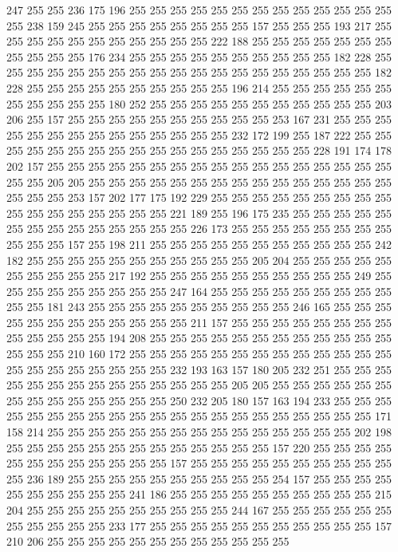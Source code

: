 247 255 255 236 175 196 255 255 255 255 255 255 255 255 255 255 255 255 255 255
238 159 245 255 255 255 255 255 255 255 255 157 255 255 255 193 217 255 255 255
255 255 255 255 255 255 255 255 222 188 255 255 255 255 255 255 255 255 255 255
255 176 234 255 255 255 255 255 255 255 255 255 255 182 228 255 255 255 255 255
255 255 255 255 255 255 255 255 255 255 255 255 255 255 182 228 255 255 255 255
255 255 255 255 255 255 196 214 255 255 255 255 255 255 255 255 255 255 255 180
252 255 255 255 255 255 255 255 255 255 255 255 203 206 255 157 255 255 255 255
255 255 255 255 255 255 253 167 231 255 255 255 255 255 255 255 255 255 255 255
255 255 255 232 172 199 255 187 222 255 255 255 255 255 255 255 255 255 255 255
255 255 255 255 255 255 228 191 174 178 202 157 255 255 255 255 255 255 255 255
255 255 255 255 255 255 255 255 255 255 255 205 205 255 255 255 255 255 255 255
255 255 255 255 255 255 255 255 255 255 255 253 157 202 177 175 192 229 255 255
255 255 255 255 255 255 255 255 255 255 255 255 255 255 255 221 189 255 196 175
235 255 255 255 255 255 255 255 255 255 255 255 255 255 255 226 173 255 255 255
255 255 255 255 255 255 255 255 157 255 198 211 255 255 255 255 255 255 255 255
255 255 255 242 182 255 255 255 255 255 255 255 255 255 255 255 205 204 255 255
255 255 255 255 255 255 255 255 217 192 255 255 255 255 255 255 255 255 255 255
249 255 255 255 255 255 255 255 255 255 247 164 255 255 255 255 255 255 255 255
255 255 255 181 243 255 255 255 255 255 255 255 255 255 255 246 165 255 255 255
255 255 255 255 255 255 255 255 255 211 157 255 255 255 255 255 255 255 255 255
255 255 255 255 194 208 255 255 255 255 255 255 255 255 255 255 255 255 255 255
255 210 160 172 255 255 255 255 255 255 255 255 255 255 255 255 255 255 255 255
255 255 255 255 255 232 193 163 157 180 205 232 251 255 255 255 255 255 255 255
255 255 255 255 255 255 255 205 205 255 255 255 255 255 255 255 255 255 255 255
255 255 255 250 232 205 180 157 163 194 233 255 255 255 255 255 255 255 255 255
255 255 255 255 255 255 255 255 255 255 255 255 171 158 214 255 255 255 255 255
255 255 255 255 255 255 255 255 255 255 202 198 255 255 255 255 255 255 255 255
255 255 255 255 255 157 220 255 255 255 255 255 255 255 255 255 255 255 255 157
255 255 255 255 255 255 255 255 255 255 255 236 189 255 255 255 255 255 255 255
255 255 255 254 157 255 255 255 255 255 255 255 255 255 255 241 186 255 255 255
255 255 255 255 255 255 255 215 204 255 255 255 255 255 255 255 255 255 255 244
167 255 255 255 255 255 255 255 255 255 255 255 233 177 255 255 255 255 255 255
255 255 255 255 255 157 210 206 255 255 255 255 255 255 255 255 255 255 255 255
